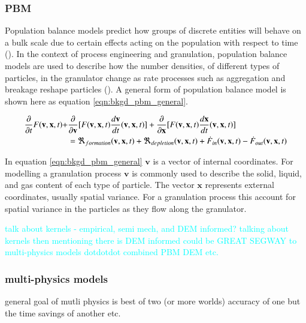 \documentclass[preprint,11pt,authoryear]{elsarticle}
\begin{document}
	    \subsubsection{PBM}
	    \par Population balance models predict how groups of discrete entities will behave on a bulk scale due to certain effects acting on the population with respect to time (\cite{ramkrishna2014}). In the context of process engineering and granulation, population balance models are used to describe how the number densities, of different types of particles, in the granulator change as rate processes such as aggregation and breakage reshape particles (\cite{Barrasso2013}). A general form of population balance model is shown here as equation \ref{eqn:bkgd_pbm_general}.
	    
	    \begin{align}
	    \frac{ \partial}{\partial t}F(\textbf{v},\textbf{x},t) +& \frac{\partial}{\partial \textbf{v}}[F(\textbf{v},\textbf{x},t)\frac{d\textbf{v}}{dt}(\textbf{v},\textbf{x},t)] + \frac{\partial}{\partial \textbf{x}}[F(\textbf{v},\textbf{x},t)\frac{d\textbf{x}}{dt}(\textbf{v},\textbf{x},t)] \notag\\
	    &= \Re_{formation}(\textbf{v},\textbf{x},t)+\Re_{depletion}(\textbf{v},\textbf{x},t)+\dot{F}_{in}(\textbf{v},\textbf{x},t)-\dot{F}_{out}(\textbf{v},\textbf{x},t)
	    \label{eqn:bkgd_pbm_general} 
	    \end{align}
	    
    \par In equation \ref{eqn:bkgd_pbm_general} $\textbf{v}$ is a vector of internal coordinates. For modelling a granulation process $\textbf{v}$ is commonly used to describe the solid, liquid, and gas content of each type of particle. The vector $\textbf{x}$ represents external coordinates, usually spatial variance. For a granulation process this  account for spatial variance in the particles as they flow along the granulator. 
	    \par \textcolor{cyan}{talk about kernels - empirical, semi mech, and DEM informed? talking about kernels then mentioning there is DEM informed could be GREAT SEGWAY to multi-physics models dotdotdot combined PBM DEM etc.}
	    
	
	    \subsubsection{multi-physics models}
		\par general goal of mutli physics is best of two (or more worlds) accuracy of one but the time savings of another etc. 
		
\end{document}
